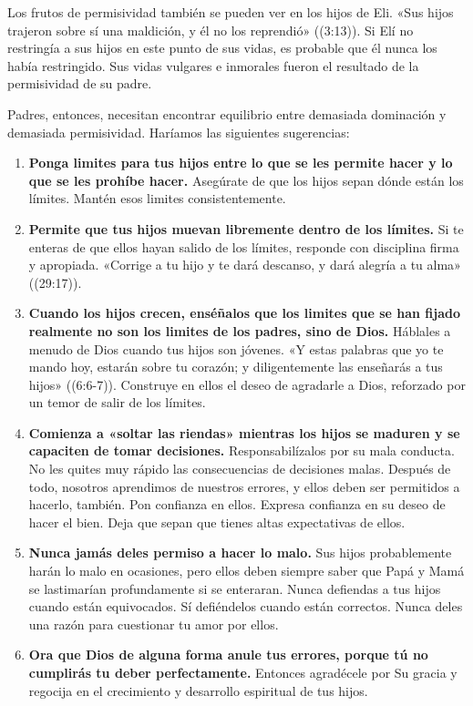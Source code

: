 \documentclass[12pt, twoside, openright]{book}
\begin{document}
Los frutos de permisividad también se pueden ver en los hijos de Eli. «Sus hijos trajeron sobre sí una maldición, y él no los reprendió» ((3:13)). Si Elí no restringía a sus hijos en este punto de sus vidas, es probable que él nunca los había restringido. Sus vidas vulgares e inmorales fueron el resultado de la permisividad de su padre.

Padres, entonces, necesitan encontrar equilibrio entre demasiada dominación y demasiada permisividad. Haríamos las siguientes sugerencias:
\begin{enumerate}
\item \textbf{Ponga limites para tus hijos entre lo que se les permite hacer y lo que se les prohíbe hacer.} Asegúrate de que los hijos sepan dónde están los límites. Mantén esos limites consistentemente. 
\item \textbf{Permite que tus hijos muevan libremente dentro de los límites.} Si te enteras de que ellos hayan salido de los límites, responde con disciplina firma y apropiada. «Corrige a tu hijo y te dará descanso, y dará alegría a tu alma» ((29:17)).
\item \textbf{Cuando los hijos crecen, enséñalos que los limites que se han fijado realmente no son los limites de los padres, sino de Dios.} Háblales a menudo de Dios cuando tus hijos son jóvenes. 
«Y estas palabras que yo te mando hoy, estarán sobre tu corazón; y diligentemente las enseñarás a tus hijos» ((6:6-7)). Construye en ellos el deseo de agradarle a Dios, reforzado por un temor de salir de los límites.
\item \textbf{Comienza a «soltar las riendas» mientras los hijos se maduren y se capaciten de tomar decisiones.} Responsabilízalos por su mala conducta. No les quites muy rápido las consecuencias de decisiones malas. Después de todo, nosotros aprendimos de nuestros errores, y ellos deben ser permitidos a hacerlo, también. Pon confianza en ellos. Expresa confianza en su deseo de hacer el bien. Deja que sepan que tienes altas expectativas de ellos.
\item \textbf{Nunca jamás deles permiso a hacer lo malo.} Sus hijos probablemente harán lo malo en ocasiones, pero ellos deben siempre saber que Papá y Mamá se lastimarían profundamente si se enteraran. Nunca defiendas a tus hijos cuando están equivocados. Sí defiéndelos cuando están correctos. Nunca deles una razón para cuestionar tu amor por ellos.
\item \textbf{Ora que Dios de alguna forma anule tus errores, porque tú no cumplirás tu deber perfectamente.} Entonces agradécele por Su gracia y regocija en el crecimiento y desarrollo espiritual de tus hijos.
\end{enumerate}
\end{document}

